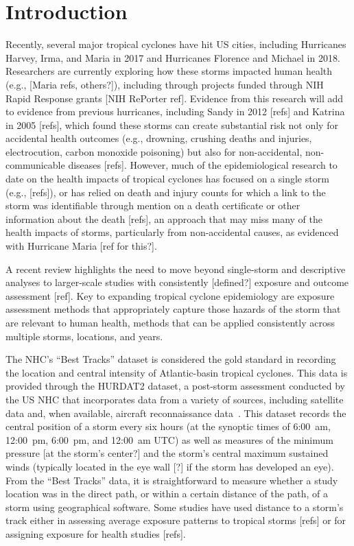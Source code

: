 \section*{Introduction}

\acresetall

Recently, several major tropical cyclones have hit \ac{US} cities, including
Hurricanes Harvey, Irma, and Maria in 2017 and Hurricanes Florence and Michael
in 2018. Researchers are currently exploring how these storms impacted human
health (e.g., [Maria refs, others?]), including through projects funded through
NIH Rapid Response grants [NIH RePorter ref].  Evidence from this research will
add to evidence from previous hurricanes, including Sandy in 2012 [refs] and
Katrina in 2005 [refs], which found these storms can create substantial risk
not only for accidental health outcomes (e.g., drowning, crushing deaths and
injuries, electrocution, carbon monoxide poisoning) but also for
non-accidental, non-communicable diseases [refs]. However, much of the
epidemiological research to date on the health impacts of tropical cyclones has
focused on a single storm (e.g., [refs]), or has relied on death and injury
counts for which a link to the storm was identifiable through mention on a
death certificate or other information about the death [refs], an approach that
may miss many of the health impacts of storms, particularly from non-accidental
causes, as evidenced with Hurricane Maria [ref for this?]. 

A recent review highlights the need to move beyond single-storm and descriptive
analyses to larger-scale studies with consistently [defined?] exposure and
outcome assessment [ref].  Key to expanding tropical cyclone epidemiology are
exposure assessment methods that appropriately capture those hazards of the
storm that are relevant to human health, methods that can be applied
consistently across multiple storms, locations, and years. 

The \ac{NHC}'s ``Best Tracks'' dataset is considered the gold standard in
recording the location and central intensity of Atlantic-basin tropical
cyclones. This data is provided through the \ac{HURDAT2} dataset, a post-storm
assessment conducted by the \ac{US} \ac{NHC} that incorporates data from a
variety of sources, including satellite data and, when available, aircraft
reconnaissance data~\parencite{landsea2013, jarvinen1988}. This dataset records
the central position of a storm every six hours (at the synoptic times of
6:00~am, 12:00~pm, 6:00~pm, and 12:00~am \ac{UTC}) as well as measures of the
minimum pressure [at the storm's center?] and the storm's central maximum
sustained winds (typically located in the eye wall [?] if the storm has
developed an eye).  From the ``Best Tracks'' data, it is straightforward to
measure whether a study location was in the direct path, or within a certain
distance of the path, of a storm using geographical software. Some studies have
used distance to a storm's track either in assessing average exposure patterns
to tropical storms [refs] or for assigning exposure for health studies [refs].

